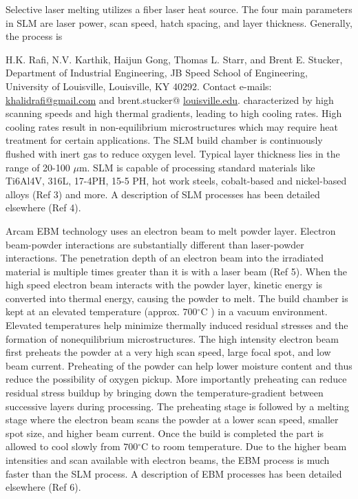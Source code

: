 \documentclass[10pt]{article}
\begin{document}
Selective laser melting utilizes a fiber laser heat source. The four main parameters in SLM are laser power, scan speed, hatch spacing, and layer thickness. Generally, the process is

H.K. Rafi, N.V. Karthik, Haijun Gong, Thomas L. Starr, and Brent E. Stucker, Department of Industrial Engineering, JB Speed School of Engineering, University of Louisville, Louisville, KY 40292. Contact e-mails: \href{mailto:khalidrafi@gmail.com}{khalidrafi@gmail.com} and brent.stucker@ \href{http://louisville.edu}{louisville.edu}. characterized by high scanning speeds and high thermal gradients, leading to high cooling rates. High cooling rates result in non-equilibrium microstructures which may require heat treatment for certain applications. The SLM build chamber is continuously flushed with inert gas to reduce oxygen level. Typical layer thickness lies in the range of 20-100 $\mu \mathrm{m}$. SLM is capable of processing standard materials like Ti6Al4V, 316L, 17-4PH, 15-5 PH, hot work steels, cobalt-based and nickel-based alloys (Ref 3) and more. A description of SLM processes has been detailed elsewhere (Ref 4).

Arcam EBM technology uses an electron beam to melt powder layer. Electron beam-powder interactions are substantially different than laser-powder interactions. The penetration depth of an electron beam into the irradiated material is multiple times greater than it is with a laser beam (Ref 5). When the high speed electron beam interacts with the powder layer, kinetic energy is converted into thermal energy, causing the powder to melt. The build chamber is kept at an elevated temperature (approx. $700{ }^{\circ} \mathrm{C}$ ) in a vacuum environment. Elevated temperatures help minimize thermally induced residual stresses and the formation of nonequilibrium microstructures. The high intensity electron beam first preheats the powder at a very high scan speed, large focal spot, and low beam current. Preheating of the powder can help lower moisture content and thus reduce the possibility of oxygen pickup. More importantly preheating can reduce residual stress buildup by bringing down the temperature-gradient between successive layers during processing. The preheating stage is followed by a melting stage where the electron beam scans the powder at a lower scan speed, smaller spot size, and higher beam current. Once the build is completed the part is allowed to cool slowly from $700{ }^{\circ} \mathrm{C}$ to room temperature. Due to the higher beam intensities and scan available with electron beams, the EBM process is much faster than the SLM process. A description of EBM processes has been detailed elsewhere (Ref 6).
\end{document}
